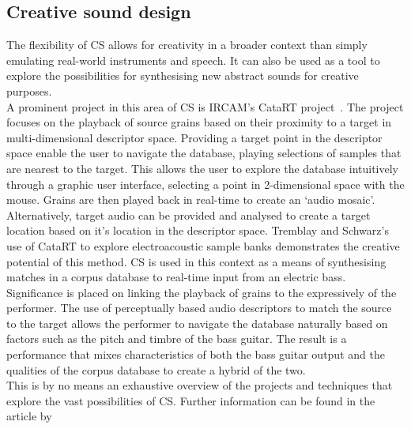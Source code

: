 \documentclass{scrartcl}
\begin{document}
    \subsection*{Creative sound design}
    The flexibility of CS allows for creativity in a broader context than simply
    emulating real-world instruments and speech. It can also be used as a tool
    to explore the possibilities for synthesising new abstract sounds for
    creative purposes.\\
    A prominent project in this area of CS is IRCAM's CataRT
    project~\parencite{Schwarz2006a}. The project focuses on the playback of
    source grains based on their proximity to a target in multi-dimensional
    descriptor space. Providing a target point in the descriptor space enable the
    user to navigate the database, playing selections of samples that
    are nearest to the target. This allows the user to explore the database
    intuitively through a graphic user interface, selecting a point in
    2-dimensional space with the mouse. Grains are then played back in
    real-time to create an `audio mosaic'.\\
    Alternatively, target audio can be provided and analysed to create a target
    location based on it's location in the descriptor space.  Tremblay and
    Schwarz's~\citeyearpar{Tremblay2010} use of CataRT to explore
    electroacoustic sample banks demonstrates the creative potential of this
    method. CS is used in this context as a means of synthesising matches in a
    corpus database to real-time input from an electric bass.  Significance is
    placed on linking the playback of grains to the expressively of the
    performer. The use of perceptually based audio descriptors to match the
    source to the target allows the performer to navigate the database
    naturally based on factors such as the pitch and timbre of the bass
    guitar. The result is a performance that mixes characteristics of both the
    bass guitar output and the qualities of the corpus database to create a
    hybrid of the two.\\
    This is by no means an exhaustive overview of the projects and techniques
    that explore the vast possibilities of CS. Further information can be found
    in the article by~\parencite{Schwarz2006b}
    \pagebreak
\end{document}
